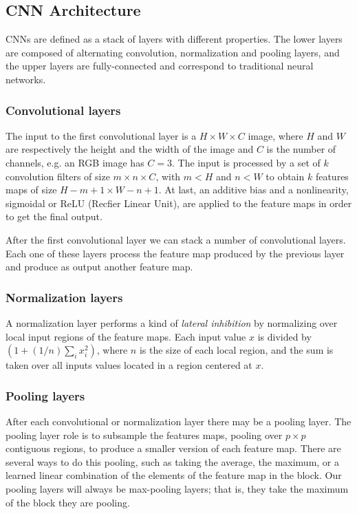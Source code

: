 \documentclass[review,12pt,3p]{elsarticle}
\begin{document}
\subsection{CNN Architecture}
CNNs are defined as a stack of layers with different properties. The lower layers are composed of alternating convolution, normalization and pooling layers, and the upper layers are fully-connected and correspond to traditional neural networks.

\subsubsection{Convolutional layers}

The input to the first convolutional layer is a $H \times W \times C$ image, where $H$ and $W$ are respectively the height and the width of the image and $C$ is the number of channels, e.g. an RGB image has $C=3$. The input is processed by a set of $k$ convolution filters of size $m \times n \times C$, with $m < H$ and $n < W$ to obtain $k$ features maps of size $H-m+1 \times W-n+1$. At last, an additive bias and a nonlinearity, sigmoidal or ReLU (Recfier Linear Unit), are applied to the feature maps in order to get the final output.

After the first convolutional layer we can stack a number of convolutional layers. Each one of these layers process the feature map produced by the previous layer and produce as output another feature map.

\subsubsection{Normalization layers}
A normalization layer performs a kind of {\em lateral inhibition} by normalizing over local input regions of the feature maps. Each input value $x$ is divided by $(1+(1/n) \sum_i x_i^2)$, where $n$ is the size of each local region, and the sum is taken over all inputs values located in a region centered at $x$.

\subsubsection{Pooling layers}
After each convolutional or normalization layer there may be a pooling layer. The pooling layer role is to subsample the features maps, pooling over $p \times p$ contiguous regions, to produce a smaller version of each feature map. There are several ways to do this pooling, such as taking the average, the maximum, or a learned linear combination of the elements of the feature map in the block. Our pooling layers will always be max-pooling layers; that is, they take the maximum of the block they are pooling.
\end{document}
